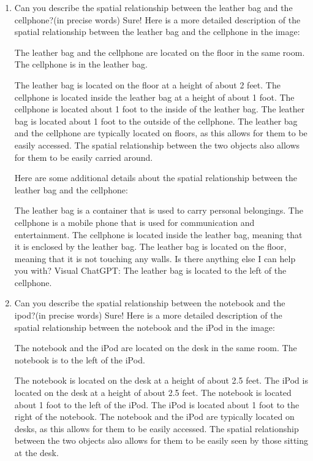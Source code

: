 \begin{enumerate}
    \item Can you describe the spatial relationship between the leather bag and the cellphone?(in precise words)
    \subitem 
    Sure! Here is a more detailed description of the spatial relationship between the leather bag and the cellphone in the image:
    
    The leather bag and the cellphone are located on the floor in the same room. The cellphone is in the leather bag.
    
    The leather bag is located on the floor at a height of about 2 feet.
    The cellphone is located inside the leather bag at a height of about 1 foot.
    The cellphone is located about 1 foot to the inside of the leather bag.
    The leather bag is located about 1 foot to the outside of the cellphone.
    The leather bag and the cellphone are typically located on floors, as this allows for them to be easily accessed. The spatial relationship between the two objects also allows for them to be easily carried around.
    
    Here are some additional details about the spatial relationship between the leather bag and the cellphone:
    
    The leather bag is a container that is used to carry personal belongings.
    The cellphone is a mobile phone that is used for communication and entertainment.
    The cellphone is located inside the leather bag, meaning that it is enclosed by the leather bag.
    The leather bag is located on the floor, meaning that it is not touching any walls.
    Is there anything else I can help you with?
    \subitem Visual ChatGPT: The leather bag is located to the left of the cellphone.
    \item Can you describe the spatial relationship between the notebook and the ipod?(in precise words)
    \subitem 
    Sure! Here is a more detailed description of the spatial relationship between the notebook and the iPod in the image:
    
    The notebook and the iPod are located on the desk in the same room. The notebook is to the left of the iPod.
    
    The notebook is located on the desk at a height of about 2.5 feet.
    The iPod is located on the desk at a height of about 2.5 feet.
    The notebook is located about 1 foot to the left of the iPod.
    The iPod is located about 1 foot to the right of the notebook.
    The notebook and the iPod are typically located on desks, as this allows for them to be easily accessed. The spatial relationship between the two objects also allows for them to be easily seen by those sitting at the desk.
    

\end{enumerate}
